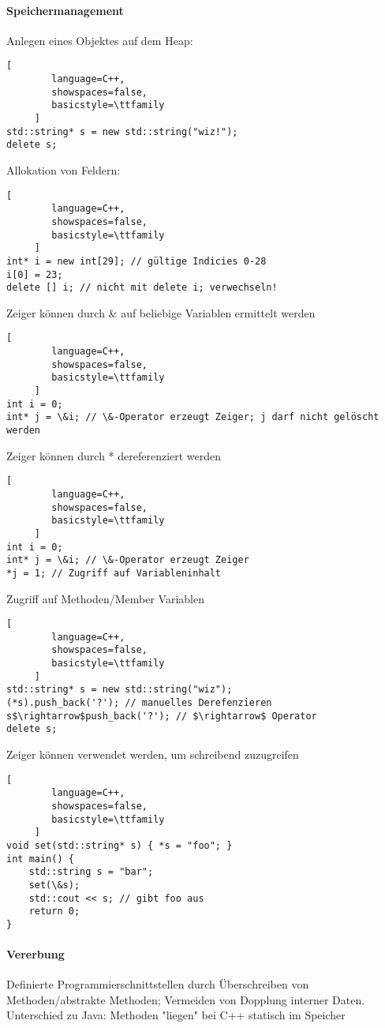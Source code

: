 \documentclass[10pt]{article}
\begin{document}
\paragraph{Speichermanagement}
Anlegen eines Objektes auf dem Heap:
\begin{lstlisting}[
        language=C++,
        showspaces=false,
        basicstyle=\ttfamily
     ]
std::string* s = new std::string("wiz!");
delete s;
\end{lstlisting}
Allokation von Feldern:
\begin{lstlisting}[
        language=C++,
        showspaces=false,
        basicstyle=\ttfamily
     ]
int* i = new int[29]; // gültige Indicies 0-28
i[0] = 23;
delete [] i; // nicht mit delete i; verwechseln!
\end{lstlisting}
Zeiger können durch \& auf beliebige Variablen ermittelt werden
\begin{lstlisting}[
        language=C++,
        showspaces=false,
        basicstyle=\ttfamily
     ]
int i = 0;
int* j = \&i; // \&-Operator erzeugt Zeiger; j darf nicht gelöscht werden
\end{lstlisting}
Zeiger können durch * dereferenziert werden
\begin{lstlisting}[
        language=C++,
        showspaces=false,
        basicstyle=\ttfamily
     ]
int i = 0;
int* j = \&i; // \&-Operator erzeugt Zeiger
*j = 1; // Zugriff auf Variableninhalt
\end{lstlisting}
Zugriff auf Methoden/Member Variablen
\begin{lstlisting}[
        language=C++,
        showspaces=false,
        basicstyle=\ttfamily
     ]
std::string* s = new std::string("wiz");
(*s).push_back('?'); // manuelles Derefenzieren
s$\rightarrow$push_back('?'); // $\rightarrow$ Operator
delete s;
\end{lstlisting}
Zeiger können verwendet werden, um schreibend zuzugreifen
\begin{lstlisting}[
        language=C++,
        showspaces=false,
        basicstyle=\ttfamily
     ]
void set(std::string* s) { *s = "foo"; }
int main() {
    std::string s = "bar";
    set(\&s);
    std::cout << s; // gibt foo aus
    return 0;
}
\end{lstlisting}

\paragraph{Vererbung}
Definierte Programmierschnittstellen durch Überschreiben von Methoden/abstrakte Methoden; Vermeiden von Dopplung interner Daten.
Unterschied zu Java: Methoden "liegen" bei C++ statisch im Speicher
\end{document}
